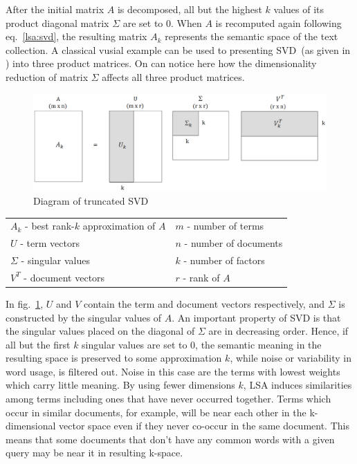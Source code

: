 After the initial matrix $A$ is decomposed, all but the highest $k$ values of its product diagonal matrix $\Sigma$ are set to $0$. When $A$ is recomputed again following eq.~\ref{lsa:svd}, the resulting  matrix $A_{k}$ represents the semantic space of the text collection. A classical vusial example can be used to presenting \gls{SVD}~(as given in \cite{Dumais88usingLSA}) into three product matrices. On can notice here how the dimensionality reduction of matrix $\Sigma$ affects all three product matrices.\\
%
%
\begin{center}
\begin{figure}[htbp]
	\centering
	\includegraphics[width=\ScaleIfNeeded]{img/svd} 
	\caption[Diagram of truncated SVD]%
           {Diagram of truncated SVD}
\label{lsa:truncated_svd}
\end{figure}
%
%
\begin{tabular}{l l}
$A_{k}$ - best rank-$k$ approximation of $A$ & $m$ - number of terms\\
$U$ - term vectors & $n$ - number of documents \\
$\Sigma$ - singular values & $k$ - number of factors \\
$V^{T}$ - document vectors & $r$ - rank of $A$ \\
\end{tabular}
\end{center} 

In fig.~\ref{lsa:truncated_svd}, $U$ and $V$ contain the term and document vectors respectively, and $\Sigma$ is constructed by the singular values of $A$. An important property of \gls{SVD} is that the singular values placed on the diagonal of $\Sigma$ are in decreasing order. Hence, if all but the first $k$ singular values are set to $0$, the semantic meaning in the resulting space is preserved to some approximation $k$, while noise or variability in word usage, is filtered out. Noise in this case are the terms with lowest weights which carry little meaning. By using fewer dimensions $k$, \gls{LSA} induces similarities among terms including ones that have never occurred together. Terms which occur in similar documents, for example, will be near each other in the k-dimensional vector space even if they never co-occur in the same document. This means that some documents that don't have any common words with a given query may be near it in resulting k-space.\\

